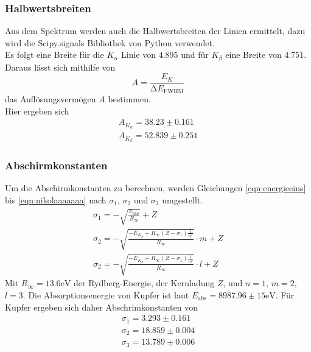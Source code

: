   \subsubsection{Halbwertsbreiten}
    Aus dem Spektrum werden auch die Halbwertsbreiten der Linien ermittelt, dazu wird die Scipy.signals Bibliothek von Python 
    verwendet. \\
    Es folgt eine Breite für die $K_{\alpha}$ Linie von $4.895$ und für $K_{\beta}$ eine Breite von $4.751$. Daraus lässt sich mithilfe von
    \begin{equation*}
      A = \frac{E_K}{\increment E_{\text{FWHM}}}
    \end{equation*}
    das Auflösungsvermögen $A$ bestimmen. \\
    Hier ergeben sich
    \begin{align*}
      A_{K_{\alpha}} = 38.23 \pm 0.161 \\
      A_{K_{\beta}} = 52.839 \pm 0.251
    \end{align*}

  \subsubsection{Abschirmkonstanten}
    Um die Abschirmkonstanten zu berechnen, werden Gleichungen \eqref{eqn:energieeins} bis \eqref{eqn:nikolaaaaaaa}
        nach $\sigma_1$, $\sigma_2$ und $\sigma_3$ umgestellt.\\
    \begin{align*}
      \sigma_1 = - \sqrt{\frac{E_{\text{abs}}}{R_{\infty}}} + Z\\
      \sigma_2 = - \sqrt{\frac{- E_{K_{\beta}} + R_{\infty} (Z - \sigma_1) \frac{1}{n^2}}{R_{\infty}}} \cdot m + Z\\
      \sigma_2 = - \sqrt{\frac{- E_{K_{\beta}} + R_{\infty} (Z - \sigma_1) \frac{1}{n^2}}{R_{\infty}}} \cdot l + Z
    \end{align*}
    Mit $R_{\infty} = 13.6 \text{eV}$ der Rydberg-Energie, der Kernladung $Z$, und $n = 1$, $m = 2$, $l = 3$. 
    Die Absorptionsenergie von Kupfer ist laut \cite{nist} $E_{\text{abs}} = 8987.96 \pm 15 \text{eV}$.
    Für Kupfer ergeben sich daher Abschrimkonstanten von
    \begin{align*}
      \sigma_1 = 3.293 \pm 0.161\\
      \sigma_2 = 18.859 \pm 0.004\\
      \sigma_3 = 13.789 \pm 0.006
    \end{align*}

